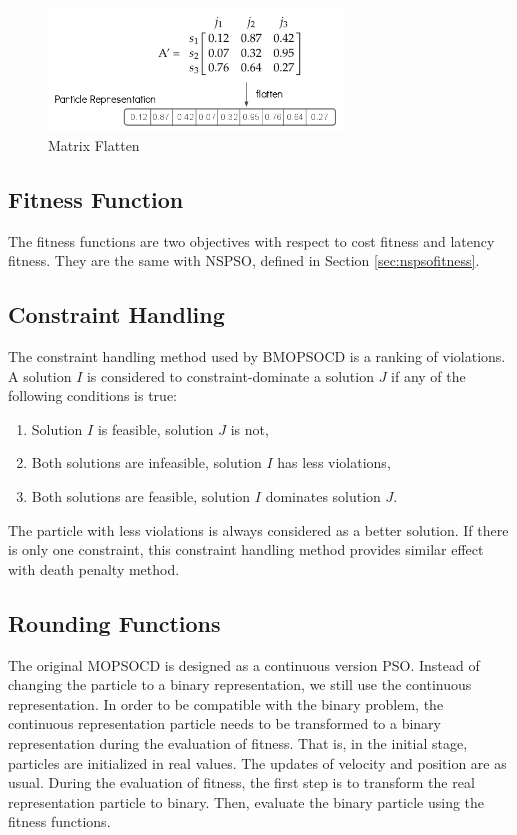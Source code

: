  \begin{figure}[H]
 \centering
   \includegraphics[width=0.7\textwidth]{pics/flatten.png}
   \caption{Matrix Flatten}
   \label{fig:flatten}
 \end{figure}

\subsection{Fitness Function}
The fitness functions are two objectives with respect to cost fitness and latency fitness.
They are the same with NSPSO, defined in Section \ref{sec:nspsofitness}.



\subsection{Constraint Handling}

The constraint handling method used by BMOPSOCD is a ranking of violations. 
A solution $I$ is considered to constraint-dominate a solution $J$ if any of the following conditions is true:
\begin{enumerate}
 \item Solution $I$ is feasible, solution $J$ is not,
 \item Both solutions are infeasible, solution $I$ has less violations,
 \item Both solutions are feasible, solution $I$ dominates solution $J$.
\end{enumerate}

The particle with less violations is always considered as  a better solution. 
If there is only one constraint, this constraint handling method provides similar effect with death penalty method.


\subsection{Rounding Functions}

The original MOPSOCD is designed as a continuous version PSO. Instead of changing the particle to a binary representation, we still use the continuous representation. 
In order to be compatible with the binary problem, the continuous representation particle needs
to be transformed to a binary representation during the evaluation of fitness.
That is, in the initial stage, particles are initialized in real values. The updates of velocity and position are as usual. 
During the evaluation of fitness, the first step is to transform the real representation particle to binary. Then, evaluate the binary particle using
the fitness functions.

